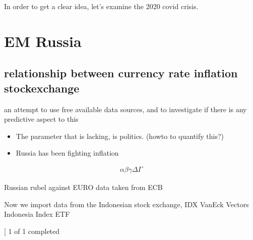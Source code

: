 \documentclass[letterpaper,10pt,english]{sphinxmanual}
\begin{document}
\sphinxAtStartPar
In order to get a clear idea, let’s examine the 2020 covid crisis.

\sphinxstepscope


\chapter{EM Russia}
\label{\detokenize{russia:em-russia}}\label{\detokenize{russia::doc}}

\section{relationship between currency rate \sphinxhyphen{} inflation \sphinxhyphen{} stockexchange}
\label{\detokenize{russia:relationship-between-currency-rate-inflation-stockexchange}}
\sphinxAtStartPar
an attempt to use free available data sources, and to investigate if
there is any predictive aspect to this
\begin{itemize}
\item {} 
\sphinxAtStartPar
The parameter that is lacking, is politics. (howto to quantify this?)

\item {} 
\sphinxAtStartPar
Russia has been fighting inflation

\end{itemize}
\begin{equation*}
\begin{split}\alpha\beta\gamma\Delta\Gamma\end{split}
\end{equation*}
\begin{sphinxVerbatim}[commandchars=\\\{\}]
       
\end{sphinxVerbatim}

\sphinxAtStartPar
Russian rubel against EURO \sphinxhyphen{} data taken from ECB

\sphinxAtStartPar
Now we import data from the Indonesian stock exchange, IDX \sphinxhyphen{} VanEck
Vectors Indonesia Index ETF
\begin{sphinxalltt}
{[}\sphinxstylestrong{*******************100\%*********************}{]}  1 of 1 completed
\end{sphinxalltt}

\begin{sphinxVerbatim}[commandchars=\\\{\}]
\end{sphinxVerbatim}
\end{document}
